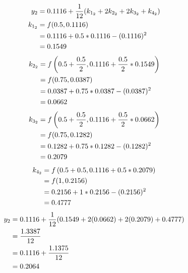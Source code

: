 	\begin{align}
		y_{2} &= 0.1116 + \frac{1}{12}(k_{1_{2}} + 2k_{2_{2}} + 2k_{3_{2}} + k_{4_{2}})& \\
		k_{1_{2}} &= f(0.5,0.1116)& \notag \\
		&= 0.1116 + 0.5*0.1116 - (0.1116)^{2}& \notag \\
		&= 0.1549&
	\end{align}
	\begin{align}
		k_{2_{2}} &= f
			\left(
				0.5 + \frac{0.5}{2}, 0.1116 + \frac{0.5}{2}*0.1549
			\right)
			& \notag \\
		&= f(0.75, 0.0387)& \notag \\
		&= 0.0387 + 0.75*0.0387 - (0.0387)^{2}& \notag \\
		&= 0.0662&
	\end{align}
	\begin{align}
		k_{3_{2}} &= f
			\left(
				0.5 + \frac{0.5}{2}, 0.1116 + \frac{0.5}{2}*0.0662
			\right)
			& \notag \\
		&= f(0.75, 0.1282)& \notag \\
		&= 0.1282 + 0.75*0.1282 - (0.1282)^{2}& \notag \\
		&= 0.2079&
	\end{align}
	\begin{align}
		k_{4_{2}} &= f
			\left(
				0.5 + 0.5, 0.1116 + 0.5*0.2079
			\right)
			& \notag \\
		&= f(1, 0.2156)& \notag \\
		&= 0.2156 + 1*0.2156 - (0.2156)^{2}& \notag \\
		&= 0.4777&
	\end{align}
	\begin{align}
		y_{2} &= 0.1116 + \frac{1}{12}(0.1549 + 2(0.0662) + 2(0.2079) + 0.4777)& \notag \\
		&= \frac{1.3387}{12}& \notag \\
		&= 0.1116 + \frac{1.1375}{12}& \notag \\
		&= 0.2064&
	\end{align}
